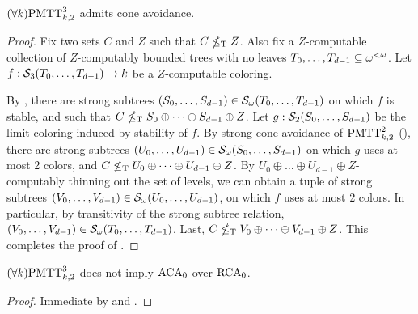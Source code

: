 \begin{theorem}\label{thm:pmtt3k2-cone-avoidance}
$(\forall k)\mathrm{PMTT}^{3}_{k,2}$ admits cone avoidance.
\end{theorem}
\begin{proof}
Fix two sets $C$ and $Z$ such that $C \nleq_{\text{\upshape T}} Z$.
Also fix a $Z$-computable collection of $Z$-computably bounded trees with no leaves $T_0, \dots,\allowbreak T_{d-1} \subseteq {\omega^{<\omega}}$.
Let $f: \mathcal{S}_{3}({T_0, \dots, T_{d-1}}) \to k$ be a $Z$-computable coloring.
 
By , there are strong subtrees $(S_0, \dots, S_{d-1}) \in \mathcal{S}_{\omega}({T_0, \dots, T_{d-1}})$ on which $f$ is stable, and such that $C \nleq_{\text{\upshape T}} S_0 \oplus \dots \oplus S_{d-1} \oplus Z$.
Let $g: \mathcal{S}_{2}({S_0, \dots, S_{d-1}})$ be the limit coloring induced by stability of $f$. By strong cone avoidance of $\mathrm{PMTT}^{2}_{k,2}$ (),
there are strong subtrees $(U_0, \dots, U_{d-1}) \in \mathcal{S}_{\omega}({S_0, \dots, S_{d-1}})$ on which $g$ uses at most 2 colors, and $C \nleq_{\text{\upshape T}} U_0 \oplus \dots \oplus U_{d-1} \oplus Z$.
By $U_0 \oplus \dots \oplus U_{d-1} \oplus Z$-computably thinning out the set of levels,
we can obtain a tuple of strong subtrees $(V_0, \dots, V_{d-1}) \in \mathcal{S}_{\omega}({U_0, \dots, U_{d-1}})$, on which $f$ uses at most 2 colors. In particular, by transitivity of the strong subtree relation, $(V_0, \dots, V_{d-1}) \in \mathcal{S}_{\omega}({T_0, \dots, T_{d-1}})$.
Last, $C \nleq_{\text{\upshape T}} V_0 \oplus \dots \oplus V_{d-1} \oplus Z$.
This completes the proof of .
\end{proof}

\begin{corollary}
$(\forall k)\mathrm{PMTT}^{3}_{k,2}$ does not imply $\mathrm{ACA}_0$ over $\mathrm{RCA}_0$.
\end{corollary}
\begin{proof}
Immediate by  and .
\end{proof}

